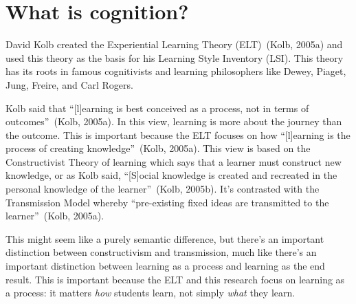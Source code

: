 \section{What is cognition?}
David Kolb created the Experiential Learning Theory (ELT)~(Kolb, 2005a) and used this theory as the basis for his Learning Style Inventory (LSI). This theory has its roots in famous cognitivists and learning philosophers like Dewey, Piaget, Jung, Freire, and Carl Rogers.

Kolb said that ``[l]earning is best conceived as a process, not in terms of outcomes''~(Kolb, 2005a). In this view, learning is more about the journey than the outcome. This is important because the ELT focuses on how ``[l]earning is the process of creating knowledge''~(Kolb, 2005a). This view is based on the Constructivist Theory of learning which says that a learner must construct new knowledge, or as Kolb said, ``[S]ocial knowledge is created and recreated in the personal knowledge of the learner''~(Kolb, 2005b). It's contrasted with the Transmission Model whereby ``pre-existing fixed ideas are transmitted to the learner''~(Kolb, 2005a).

This might seem like a purely semantic difference, but there's an important distinction between constructivism and transmission, much like there's an important distinction between learning as a process and learning as the end result. This is important because the ELT and this research focus on learning as a process: it matters \emph{how} students learn, not simply \emph{what} they learn.

